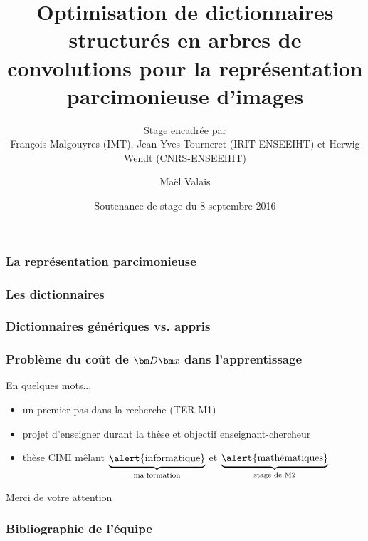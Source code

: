 


\title{Optimisation de dictionnaires structurés en arbres de convolutions pour la représentation parcimonieuse d'images}
\subtitle{Stage encadrée par\\François Malgouyres (IMT), Jean-Yves Tourneret (IRIT-ENSEEIHT) et Herwig Wendt (CNRS-ENSEEIHT)}

\date{Soutenance de stage du 8 septembre 2016}
\author{Maël Valais}



\maketitle





\begin{frame}[label=LO]
\frametitle{La représentation parcimonieuse}
\end{frame}

\begin{frame}[]
\frametitle{Les dictionnaires}

\end{frame}

\begin{frame}[]
\frametitle{Dictionnaires génériques vs. appris}
\end{frame}

\begin{frame}[]
\frametitle{Problème du coût de $\D\x$  dans l'apprentissage}
\end{frame}

\begin{frame}{En quelques mots...}
\begin{itemize}
\item un premier pas dans la recherche (TER M1)
\item projet d'\alert{enseigner} durant la thèse et objectif enseignant-chercheur
\item thèse CIMI mêlant $\underbrace{\text{\alert{informatique}}}_{\text{ma formation}}$ et $\underbrace{\text{\alert{mathématiques}}}_{\text{stage de M2}}$
\end{itemize}
\vfill
\hfill Merci de votre attention
\end{frame}

\appendix

\begin{frame}
\frametitle{Bibliographie de l'équipe}
\nocite{*}
\printbibliography[heading=none]
\end{frame}



